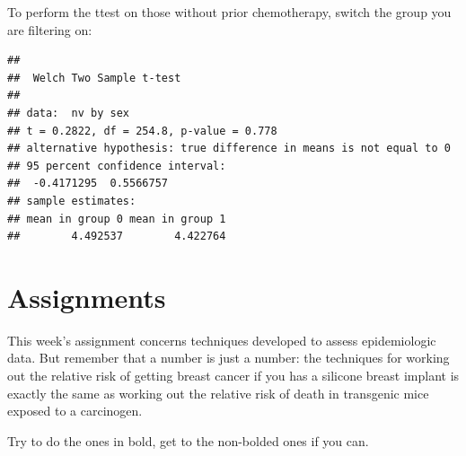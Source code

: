 \documentclass[]{book}
\newenvironment{Shaded}{\begin{snugshade}}{\end{snugshade}}
\newcommand{\DataTypeTok}[1]{\textcolor[rgb]{0.13,0.29,0.53}{#1}}
\newcommand{\DecValTok}[1]{\textcolor[rgb]{0.00,0.00,0.81}{#1}}
\newcommand{\KeywordTok}[1]{\textcolor[rgb]{0.13,0.29,0.53}{\textbf{#1}}}
\newcommand{\NormalTok}[1]{#1}
\newcommand{\OperatorTok}[1]{\textcolor[rgb]{0.81,0.36,0.00}{\textbf{#1}}}
\newcommand{\StringTok}[1]{\textcolor[rgb]{0.31,0.60,0.02}{#1}}
\begin{document}
To perform the ttest on those without prior chemotherapy, switch the
group you are filtering on:

\begin{Shaded}
\end{Shaded}

\begin{verbatim}
## 
##  Welch Two Sample t-test
## 
## data:  nv by sex
## t = 0.2822, df = 254.8, p-value = 0.778
## alternative hypothesis: true difference in means is not equal to 0
## 95 percent confidence interval:
##  -0.4171295  0.5566757
## sample estimates:
## mean in group 0 mean in group 1 
##        4.492537        4.422764
\end{verbatim}

\hypertarget{assignments-3}{%
\section{Assignments}\label{assignments-3}}

This week's assignment concerns techniques developed to assess
epidemiologic data. But remember that a number is just a number: the
techniques for working out the relative risk of getting breast cancer if
you has a silicone breast implant is exactly the same as working out the
relative risk of death in transgenic mice exposed to a carcinogen.

Try to do the ones in bold, get to the non-bolded ones if you can.
\end{document}
